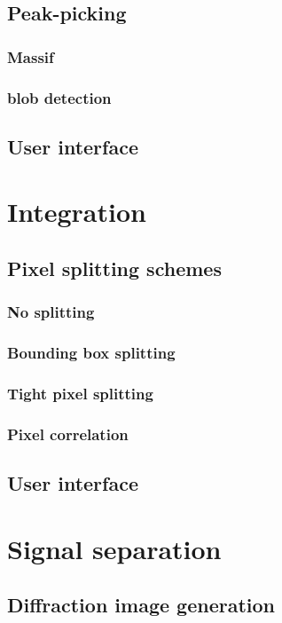 \documentclass[preprint]{iucr}
\begin{document}
\subsection{Peak-picking}

\subsubsection{Massif}
\subsubsection{blob detection}
\subsection{User interface}
\section{Integration}
\subsection{Pixel splitting schemes}
\subsubsection{No splitting}
\subsubsection{Bounding box splitting}
\subsubsection{Tight pixel splitting}
\subsubsection{Pixel correlation}
\subsection{User interface}

\section{Signal separation}
\subsection{Diffraction image generation}
\end{document}
